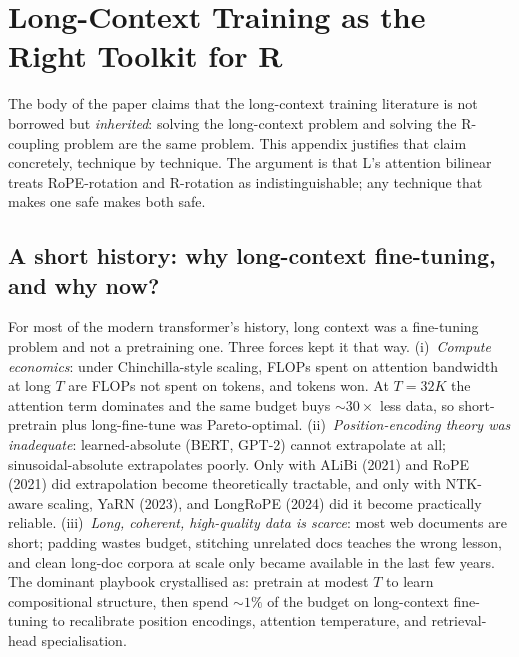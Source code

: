 \documentclass[10pt, twocolumn, a4paper]{article}
\begin{document}
\appendix


\section{Long-Context Training as the Right Toolkit for R}
\label{app:long_context_R}

The body of the paper claims that the long-context training literature is not borrowed but \emph{inherited}: solving the long-context problem and solving the R-coupling problem are the same problem. This appendix justifies that claim concretely, technique by technique. The argument is that L's attention bilinear treats RoPE-rotation and R-rotation as indistinguishable; any technique that makes one safe makes both safe.

\subsection*{A short history: why long-context fine-tuning, and why now?}

For most of the modern transformer's history, long context was a fine-tuning problem and not a pretraining one. Three forces kept it that way. (i)~\emph{Compute economics}: under Chinchilla-style scaling, FLOPs spent on attention bandwidth at long $T$ are FLOPs not spent on tokens, and tokens won. At $T=32K$ the attention term dominates and the same budget buys $\sim\!30\times$ less data, so short-pretrain plus long-fine-tune was Pareto-optimal. (ii)~\emph{Position-encoding theory was inadequate}: learned-absolute (BERT, GPT-2) cannot extrapolate at all; sinusoidal-absolute extrapolates poorly. Only with ALiBi (2021) and RoPE (2021) did extrapolation become theoretically tractable, and only with NTK-aware scaling, YaRN (2023), and LongRoPE (2024) did it become practically reliable. (iii)~\emph{Long, coherent, high-quality data is scarce}: most web documents are short; padding wastes budget, stitching unrelated docs teaches the wrong lesson, and clean long-doc corpora at scale only became available in the last few years. The dominant playbook crystallised as: pretrain at modest $T$ to learn compositional structure, then spend $\sim\!1\%$ of the budget on long-context fine-tuning to recalibrate position encodings, attention temperature, and retrieval-head specialisation.
\end{document}
